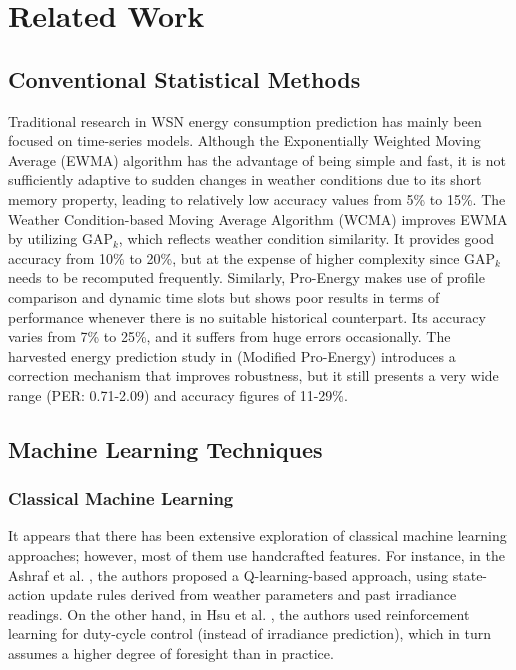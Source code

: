 \documentclass[journal]{IEEEtran}
\begin{document}
\section{Related Work}

\subsection{Conventional Statistical Methods}

Traditional research in WSN energy consumption prediction has mainly been focused on time-series models. Although the Exponentially Weighted Moving Average (EWMA) algorithm \cite{ref5} has the advantage of being simple and fast, it is not sufficiently adaptive to sudden changes in weather conditions due to its short memory property, leading to relatively low accuracy values from 5\% to 15\%. The Weather Condition-based Moving Average Algorithm (WCMA) \cite{ref6} improves EWMA by utilizing GAP$_k$, which reflects weather condition similarity. It provides good accuracy from 10\% to 20\%, but at the expense of higher complexity since GAP$_k$ needs to be recomputed frequently. Similarly, Pro-Energy \cite{ref7} makes use of profile comparison and dynamic time slots but shows poor results in terms of performance whenever there is no suitable historical counterpart. Its accuracy varies from 7\% to 25\%, and it suffers from huge errors occasionally. The harvested energy prediction study in \cite{ref8} (Modified Pro-Energy) introduces a correction mechanism that improves robustness, but it still presents a very wide range (PER: 0.71-2.09) and accuracy figures of 11-29\%.

\subsection{Machine Learning Techniques}

\subsubsection{Classical Machine Learning}
It appears that there has been extensive exploration of classical machine learning approaches; however, most of them use handcrafted features. For instance, in the Ashraf et al. \cite{ref9}, the authors proposed a Q-learning-based approach, using state-action update rules derived from weather parameters and past irradiance readings. On the other hand, in Hsu et al. \cite{ref10}, the authors used reinforcement learning for duty-cycle control (instead of irradiance prediction), which in turn assumes a higher degree of foresight than in practice.
\end{document}
